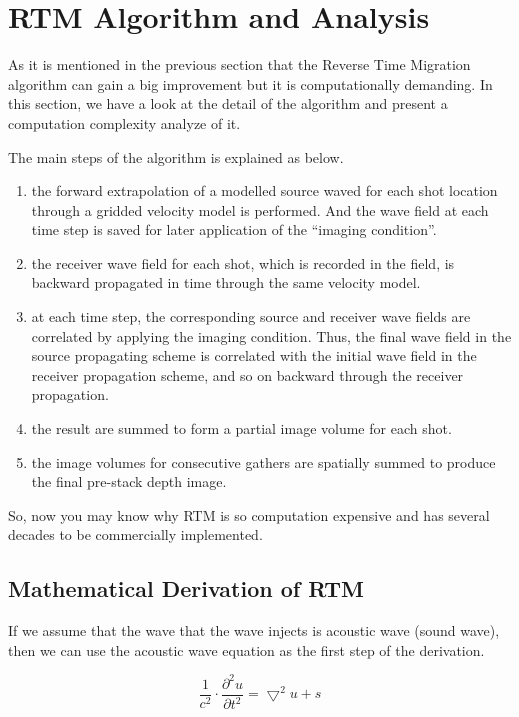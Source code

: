 \section{RTM Algorithm and Analysis}

As it is mentioned in the previous section that the Reverse Time Migration
algorithm can gain a big improvement but it is computationally demanding.
In this section, we have a look at the detail of the algorithm and present
a computation complexity analyze of it.

The main steps of the algorithm is explained as below\cite{rtm}.

\begin{enumerate}
\item the forward extrapolation of a modelled source waved for each shot
  location through a gridded velocity model is performed. And the wave
  field at each time step is saved for later application of the ``imaging
  condition''.
\item the receiver wave field for each shot, which is recorded in the
  field, is backward propagated in time through the same velocity model.
\item at each time step, the corresponding source and receiver wave fields
  are correlated by applying the imaging condition. Thus, the final
  wave field in the source propagating scheme is correlated with the
  initial wave field in the receiver propagation scheme, and so on backward
  through the receiver propagation.
\item the result are summed to form a partial image volume for each shot.
\item the image volumes for consecutive gathers are spatially summed to
  produce the final pre-stack depth image.
\end{enumerate}

So, now you may know why RTM is so computation expensive and has several
decades to be commercially implemented.

\subsection{Mathematical Derivation of RTM}

If we assume that the wave that the wave injects is acoustic wave (sound
wave), then we can use the acoustic wave equation as the first step of the
derivation.

\begin{equation}
  \frac{1}{c^2}\cdot\frac{\partial ^2u}{\partial t^2}=\bigtriangledown ^2u +s
\end{equation}

